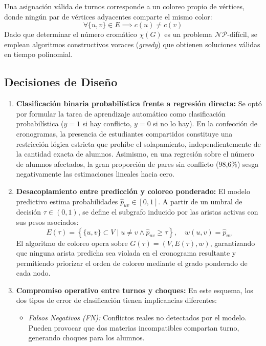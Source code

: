 \documentclass[11pt,a4paper]{article}
\begin{document}
Una asignación válida de turnos corresponde a un coloreo propio de vértices, donde ningún par de vértices adyacentes comparte el mismo color:
\begin{equation}
    \forall \{u, v\} \in E \implies c(u) \neq c(v)
\end{equation}
Dado que determinar el número cromático $\chi(G)$ es un problema $\mathcal{NP}$-difícil, se emplean algoritmos constructivos voraces (\textit{greedy}) que obtienen soluciones válidas en tiempo polinomial.

\subsection{Decisiones de Diseño}
\begin{enumerate}
    \item \textbf{Clasificación binaria probabilística frente a regresión directa:} Se optó por formular la tarea de aprendizaje automático como clasificación probabilística ($y = 1$ si hay conflicto, $y = 0$ si no lo hay). En la confección de cronogramas, la presencia de estudiantes compartidos constituye una restricción lógica estricta que prohíbe el solapamiento, independientemente de la cantidad exacta de alumnos. Asimismo, en una regresión sobre el número de alumnos afectados, la gran proporción de pares sin conflicto (98,6\%) sesga negativamente las estimaciones lineales hacia cero.
    \item \textbf{Desacoplamiento entre predicción y coloreo ponderado:} El modelo predictivo estima probabilidades $\hat{p}_{uv} \in [0, 1]$. A partir de un umbral de decisión $\tau \in (0, 1)$, se define el subgrafo inducido por las aristas activas con sus pesos asociados:
    \begin{equation}
        E(\tau) = \left\{ \{u, v\} \subset V \mid u \neq v \land \hat{p}_{uv} \ge \tau \right\}, \quad w(u, v) = \hat{p}_{uv}
    \end{equation}
    El algoritmo de coloreo opera sobre $G(\tau) = (V, E(\tau), w)$, garantizando que ninguna arista predicha sea violada en el cronograma resultante y permitiendo priorizar el orden de coloreo mediante el grado ponderado de cada nodo.
    \item \textbf{Compromiso operativo entre turnos y choques:} En este esquema, los dos tipos de error de clasificación tienen implicancias diferentes:
    \begin{itemize}
        \item \textit{Falsos Negativos (FN):} Conflictos reales no detectados por el modelo. Pueden provocar que dos materias incompatibles compartan turno, generando choques para los alumnos.

\end{itemize}
\end{enumerate}
\end{document}
